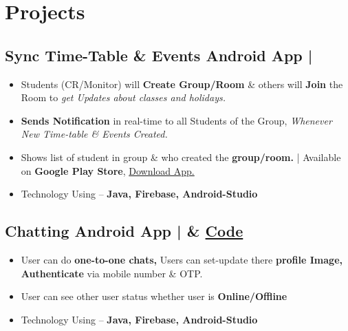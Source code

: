 \documentclass[a4,11pt]{article}
\newenvironment{zitemize}{
\begin{itemize}\itemsep0pt \parskip0pt \parsep1pt}
{\end{itemize}\vspace{-0.5cm}}
\begin{document}
\section{Projects} 
\vspace{0.2cm}
\subsection{ \large Sync Time-Table \& Events Android App | }
    \begin{zitemize}
        \item Students (CR/Monitor) will \textbf{Create  Group/Room} \& others will \textbf{Join} the Room to \emph{get Updates about classes and holidays.}
        \item \textbf{Sends Notification} in real-time to all Students of the Group,  \emph{Whenever New Time-table \& Events Created.}
        \item Shows list of student in group \& who created the \textbf{group/room.} | Available on \textbf{Google Play Store}, \href{https://play.google.com/store/apps/details?id=com.gracoder.syncwithclass}{Download App.}
        \item Technology Using – \textbf{ Java, Firebase, Android-Studio}
    \end{zitemize}

    
\subsection{\large Chatting Android App | \faGithub & \normalfont \href{https://github.com/akhilsharmaa/Whatsapp-ChatApp}{Code}
\hfill{}}
    \begin{zitemize}
        \item User can do \textbf{one-to-one chats,} Users can set-update there \textbf{profile Image, Authenticate} via mobile number \& OTP.
        \item User can see other user status whether user is \textbf{Online/Offline}
        \item Technology Using – \textbf{ Java, Firebase, Android-Studio}
    \end{zitemize}
\end{document}
